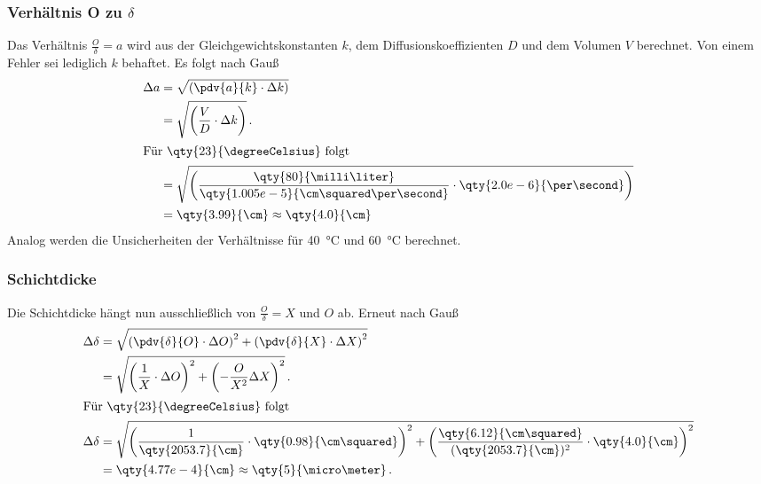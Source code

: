 \subsubsection{Verhältnis O zu $\delta$}
Das Verhältnis $\frac{O}{\delta} = a$ wird aus der Gleichgewichtskonstanten $k$, dem Diffusionskoeffizienten $D$ und dem Volumen $V$ berechnet.
Von einem Fehler sei lediglich $k$ behaftet.
Es folgt nach Gauß
\begin{align*}
    \Delta a &= \sqrt{ \left( \pdv{a}{k} \cdot \Delta k \right) } \\
             &= \sqrt{ \left( \frac{V}{D} \cdot \Delta k \right) }\, \text{.} \\
\intertext{Für \qty{23}{\degreeCelsius} folgt}
             &= \sqrt{ \left( \frac{\qty{80}{\milli\liter}}{\qty{1.005e-5}{\cm\squared\per\second}} \cdot \qty{2.0e-6}{\per\second} \right) } \\
             &= \qty{3.99}{\cm} \approx \qty{4.0}{\cm}
\end{align*}
Analog werden die Unsicherheiten der Verhältnisse für \qty{40}{\degreeCelsius} und \qty{60}{\degreeCelsius} berechnet.

\subsubsection{Schichtdicke}
Die Schichtdicke hängt nun ausschließlich von $\frac{O}{\delta} = X$ und $O$ ab.
Erneut nach Gauß
\begin{align*}
    \Delta \delta &= \sqrt{ \left( \pdv{\delta}{O} \cdot \Delta O \right)^2 + \left( \pdv{\delta}{X} \cdot \Delta X \right)^2  } \\
                  &= \sqrt{ \left( \frac{1}{X} \cdot \Delta O \right)^2 + \left( - \frac{O}{X^2} \Delta X \right)^2 }\, \text{.} \\
\intertext{Für \qty{23}{\degreeCelsius} folgt}
    \Delta \delta &= \sqrt{ \left( \frac{1}{\qty{2053.7}{\cm}} \cdot \qty{0.98}{\cm\squared} \right)^2 
                            + \left( \frac{\qty{6.12}{\cm\squared}}{(\qty{2053.7}{\cm})^2} \cdot \qty{4.0}{\cm} \right)^2 } \\
                  &= \qty{4.77e-4}{\cm} \approx \qty{5}{\micro\meter}\, \text{.}
\end{align*}




